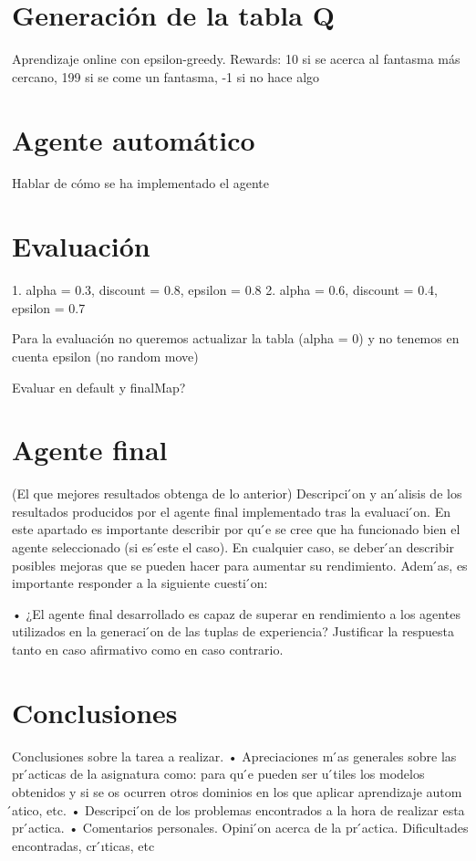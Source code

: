 \documentclass[12pt]{article}
\begin{document}
\section{Generación de la tabla Q}
Aprendizaje online con epsilon-greedy. Rewards: 10 si se acerca al fantasma más cercano, 199 si se come un fantasma, -1 si no hace algo

\section{Agente automático}
Hablar de cómo se ha implementado el agente

\section{Evaluación}
1. alpha = 0.3, discount = 0.8, epsilon = 0.8
2. alpha = 0.6, discount = 0.4, epsilon = 0.7

Para la evaluación no queremos actualizar la tabla (alpha = 0) y no tenemos en cuenta epsilon (no random move)

Evaluar en default y finalMap?

\section{Agente final}
(El que mejores resultados obtenga de lo anterior)
Descripci ́on y an ́alisis de los resultados producidos por el agente final implementado tras la evaluaci ́on. En este apartado es importante describir por qu ́e se cree que ha funcionado bien el agente seleccionado (si es  ́este el caso). En cualquier caso, se deber ́an describir posibles mejoras que se pueden hacer para aumentar su rendimiento. Adem ́as, es importante responder a la siguiente cuesti ́on:
        
• ¿El agente final desarrollado es capaz de superar en rendimiento a los agentes utilizados en la generaci ́on de las tuplas de experiencia? Justificar la respuesta tanto en caso afirmativo como en caso contrario.


\section{Conclusiones}
Conclusiones sobre la tarea a realizar.
• Apreciaciones m ́as generales sobre las pr ́acticas de la asignatura como: para qu ́e pueden ser u ́tiles los modelos obtenidos y si se os ocurren otros dominios en los que aplicar aprendizaje autom ́atico, etc.
• Descripci ́on de los problemas encontrados a la hora de realizar esta pr ́actica.
• Comentarios personales. Opini ́on acerca de la pr ́actica. Dificultades encontradas, cr ́ıticas, etc
\end{document}
